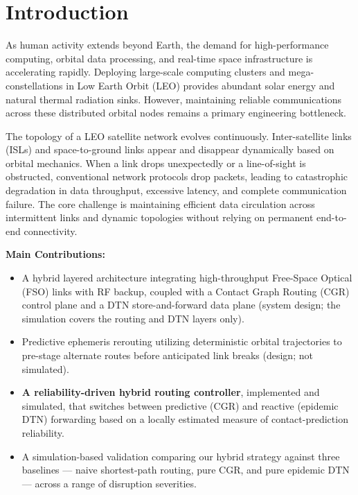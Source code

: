 \documentclass[10pt,twocolumn]{article}
\begin{document}
\section{Introduction}
\label{sec:intro}

As human activity extends beyond Earth, the demand for high-performance computing, orbital data processing, and real-time space infrastructure is accelerating rapidly. Deploying large-scale computing clusters and mega-constellations in Low Earth Orbit (LEO) provides abundant solar energy and natural thermal radiation sinks. However, maintaining reliable communications across these distributed orbital nodes remains a primary engineering bottleneck.

The topology of a LEO satellite network evolves continuously. Inter-satellite links (ISLs) and space-to-ground links appear and disappear dynamically based on orbital mechanics. When a link drops unexpectedly or a line-of-sight is obstructed, conventional network protocols drop packets, leading to catastrophic degradation in data throughput, excessive latency, and complete communication failure. The core challenge is maintaining efficient data circulation across intermittent links and dynamic topologies without relying on permanent end-to-end connectivity.

\textbf{Main Contributions:}
\begin{itemize}[leftmargin=1.1em]
    \item A hybrid layered architecture integrating high-throughput Free-Space Optical (FSO) links with RF backup, coupled with a Contact Graph Routing (CGR) control plane and a DTN store-and-forward data plane (system design; the simulation covers the routing and DTN layers only).
    \item Predictive ephemeris rerouting utilizing deterministic orbital trajectories to pre-stage alternate routes before anticipated link breaks (design; not simulated).
    \item \textbf{A reliability-driven hybrid routing controller}, implemented and simulated, that switches between predictive (CGR) and reactive (epidemic DTN) forwarding based on a locally estimated measure of contact-prediction reliability.
    \item A simulation-based validation comparing our hybrid strategy against three baselines --- naive shortest-path routing, pure CGR, and pure epidemic DTN --- across a range of disruption severities.
\end{itemize}
\end{document}
